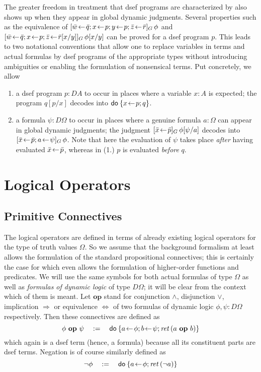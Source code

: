 The greater freedom in treatment that dsef programs are characterized by also
shows up when they appear in global dynamic judgments. Several properties such
as the equivalence of $\Gdj{\bar w\leteq \bar q; x\leteq p; y\leteq p; \bar
  z\leteq \bar r}\phi$ and $[\bar w\!\gets\! \bar q; x\!\gets\! p; \bar z\!\gets\! \bar
  r[x/y]]_G\,\phi[x/y]$ can be proved for a dsef program $p$. This leads to two
notational conventions that allow one to replace variables in terms and actual
formulas by dsef programs of the appropriate types without introducing
ambiguities or enabling the formulation of nonsensical terms. Put concretely, we
allow
\begin{enumerate}
\item a dsef program $p : DA$ to occur in places where a variable $x : A$ is
  expected; the program $q[p/x]$ decodes into $\mathsf{do}\: \{x\!\gets\! p; q\}$.
\item a formula $\psi : D\Omega$ to occur in places where a genuine formula $a: \Omega$ can
  appear in global dynamic judgments; the judgment $[\bar x\!\gets\! \bar
    p]_G\,\phi[\psi/a]$ decodes into $[\bar x\!\gets\! \bar p; a\!\gets\! \psi]_G\,\phi$. Note that
  here the evaluation of $\psi$ takes place \emph{after} having evaluated $\bar
  x\!\gets\! \bar p$, whereas in (1.) $p$ is evaluated \emph{before} $q$.
\end{enumerate}


\section{Logical Operators}
\label{sec:logic-operators}


\subsection{Primitive Connectives}
\label{sec:prim-conn}

The logical operators are defined in terms of already existing logical operators
for the type of truth values $\Omega$. So we assume that the background formalism at
least allows the formulation of the standard propositional connectives; this is
certainly the case for \IsabelleHOL which even allows the formulation of
higher-order functions and predicates. We will use the same symbols for both
actual formulas of type $\Omega$ as well as \emph{formulas of dynamic logic} of type
$D\Omega$; it will be clear from the context which of them is meant. Let
$\mathbf{op}$ stand for conjunction $\land$, disjunction $\lor$, implication $\Rightarrow$ or
equivalence $\iff$ of two formulas of dynamic logic $\phi, \psi: D\Omega$ respectively. Then
these connectives are defined as
\[ \phi\ \mathbf{op}\ \psi \quad:=\quad \mathsf{do}\: \{a\!\gets\! \phi; b\!\gets\! \psi; \mathit{ret\,} (a\ \mathbf{op}\ b)\} 
\]
which again is a dsef term (hence, a formula) because all its constituent parts
are dsef terms. Negation is of course similarly defined  as
\[ \lnot \phi \quad := \quad \mathsf{do}\: \{a\!\gets\! \phi; \mathit{ret\,} (\lnot a)\} \]

